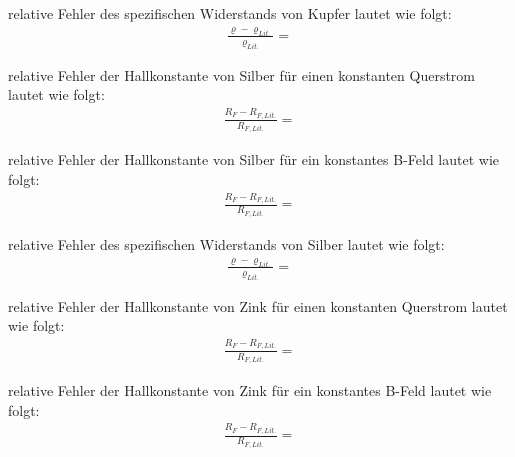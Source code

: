 \justifying relative Fehler des spezifischen Widerstands von Kupfer lautet wie folgt:
\begin{align}
    \frac{\varrho - \varrho_{Lit.}}{\varrho_{Lit.}} = \text{}
\end{align}


\justifying relative Fehler der Hallkonstante von Silber für einen konstanten Querstrom lautet wie folgt:
\begin{align}
    \frac{R_F - R_{F,Lit.}}{R_{F,Lit.}} = \text{}
\end{align}

\justifying relative Fehler der Hallkonstante von Silber für ein konstantes B-Feld lautet wie folgt:
\begin{align}
    \frac{R_F - R_{F,Lit.}}{R_{F,Lit.}} = \text{}
\end{align}

\justifying relative Fehler des spezifischen Widerstands von Silber lautet wie folgt:
\begin{align}
    \frac{\varrho - \varrho_{Lit.}}{\varrho_{Lit.}} = \text{}
\end{align}


\justifying relative Fehler der Hallkonstante von Zink für einen konstanten Querstrom lautet wie folgt:
\begin{align}
    \frac{R_F - R_{F,Lit.}}{R_{F,Lit.}} = \text{}
\end{align}

\justifying relative Fehler der Hallkonstante von Zink für ein konstantes B-Feld lautet wie folgt:
\begin{align}
    \frac{R_F - R_{F,Lit.}}{R_{F,Lit.}} = \text{}
\end{align}

\newpage
\printbibliography

